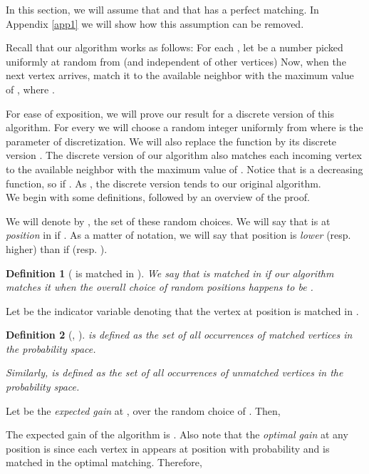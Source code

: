 \documentclass[11pt]{article}
\newtheorem{definition}{Definition}
\begin{document}
In this section, we will assume that  and that  has
a perfect matching. In Appendix \ref{app1} we will show how this
assumption can be removed.

Recall that our algorithm works as follows: For each , let
 be a number picked uniformly at random from  (and
independent of other vertices) Now, when the next vertex 
arrives, match it to the available neighbor  with the maximum value
of , where .

For ease of exposition, we will prove our result for a discrete
version of this algorithm. For every  we will choose a random
integer  uniformly from  where  is the
parameter of discretization. We will also replace the
function  by its discrete version . The discrete version of our
algorithm also matches each incoming vertex  to the available
neighbor  with the maximum value of . Notice
that  is a decreasing function, so  if . As , the discrete version tends to our
original algorithm.\\


We begin with some definitions, followed by an overview of the proof.

We will denote by , the set of these random choices. We will say that  is at
\emph{position}  in  if . As a matter of
notation, we will say that position  is \emph{lower} (resp. higher)
than  if  (resp. ).

\begin{definition}[ is matched in ]
We say that  is matched in  if our algorithm matches it
when the overall choice of random positions happens to be
. 
\end{definition}

Let  be the indicator variable denoting that the vertex
at position  is matched in . 

\begin{definition}[, ]
 is defined as the set of all occurrences of matched vertices in the probability space.

Similarly,  is defined as the set of all occurrences of unmatched vertices in the probability space.

\end{definition}

Let  be the \emph{expected gain} at , over the random choice
of . Then,


The expected gain of the algorithm is . Also note that the \emph{optimal gain} at any position
 is  since each vertex in 
appears at position  with probability  and is matched in the
optimal matching. Therefore,
\end{document}
